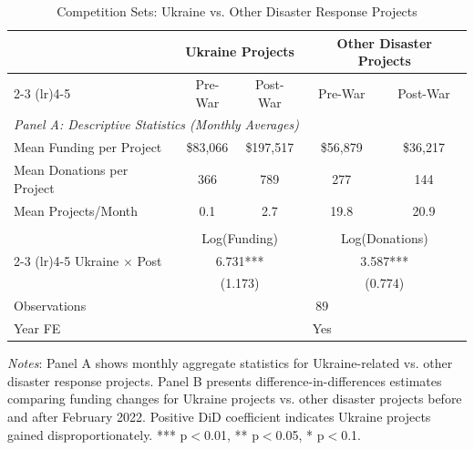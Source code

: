 \begin{table}[htbp]
\centering
\caption{Competition Sets: Ukraine vs. Other Disaster Response Projects}
\label{tab:competition_sets}
\begin{threeparttable}
\begin{tabular}{lcccc}
\toprule
& \multicolumn{2}{c}{Ukraine Projects} & \multicolumn{2}{c}{Other Disaster Projects} \\
\cmidrule(lr){2-3} \cmidrule(lr){4-5}
& Pre-War & Post-War & Pre-War & Post-War \\
\midrule
\multicolumn{5}{l}{\textit{Panel A: Descriptive Statistics (Monthly Averages)}} \\
Mean Funding per Project & \$83,066 & \$197,517 & \$56,879 & \$36,217 \\
Mean Donations per Project & 366 & 789 & 277 & 144 \\
Mean Projects/Month & 0.1 & 2.7 & 19.8 & 20.9 \\
\addlinespace
\multicolumn{5}{l}{\textit{Panel B: Difference-in-Differences Estimates}} \\
& \multicolumn{2}{c}{Log(Funding)} & \multicolumn{2}{c}{Log(Donations)} \\
\cmidrule(lr){2-3} \cmidrule(lr){4-5}
Ukraine $\times$ Post & \multicolumn{2}{c}{6.731***} & \multicolumn{2}{c}{3.587***} \\
& \multicolumn{2}{c}{(1.173)} & \multicolumn{2}{c}{(0.774)} \\
\addlinespace
Observations & \multicolumn{4}{c}{89} \\
Year FE & \multicolumn{4}{c}{Yes} \\
\bottomrule
\end{tabular}
\begin{tablenotes}
\small
\item \textit{Notes}: Panel A shows monthly aggregate statistics for Ukraine-related vs. other disaster response projects. Panel B presents difference-in-differences estimates comparing funding changes for Ukraine projects vs. other disaster projects before and after February 2022. Positive DiD coefficient indicates Ukraine projects gained disproportionately. *** p$<$0.01, ** p$<$0.05, * p$<$0.1.
\end{tablenotes}
\end{threeparttable}
\end{table}

